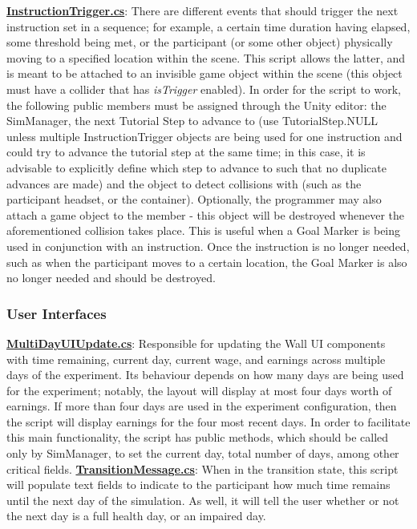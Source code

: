 \documentclass{article}
\begin{document}
\href{https://bit.ly/2uwAQ1u}{\textbf{InstructionTrigger.cs}}: There are different events that should trigger the next instruction set in a sequence; for example, a certain time duration having elapsed, some threshold being met, or the participant (or some other object) physically moving to a specified location within the scene. This script allows the latter, and is meant to be attached to an invisible game object within the scene (this object must have a collider that has \textit{isTrigger} enabled). In order for the script to work, the following public members must be assigned through the Unity editor: the SimManager, the next Tutorial Step to advance to (use TutorialStep.NULL unless multiple InstructionTrigger objects are being used for one instruction and could try to advance the tutorial step at the same time; in this case, it is advisable to explicitly define which step to advance to such that no duplicate advances are made) and the object to detect collisions with (such as the participant headset, or the container). Optionally, the programmer may also attach a game object to the  member - this object will be destroyed whenever the aforementioned collision takes place. This is useful when a Goal Marker is being used in conjunction with an instruction. Once the instruction is no longer needed, such as when the participant moves to a certain location, the Goal Marker is also no longer needed and should be destroyed. 


\subsubsection*{User Interfaces}
\href{https://bit.ly/2G9SRs1}{\textbf{MultiDayUIUpdate.cs}}: Responsible for updating the Wall UI components with time remaining, current day, current wage, and earnings across multiple days of the experiment. Its behaviour depends on how many days are being used for the experiment; notably, the layout will display at most four days worth of earnings. If more than four days are used in the experiment configuration, then the script will display earnings for the four most recent days. In order to facilitate this main functionality, the script has public methods, which should be called only by SimManager, to set the current day, total number of days, among other critical fields. \newline \newline
\href{https://bit.ly/2VHtW5B}{\textbf{TransitionMessage.cs}}: When in the transition state, this script will populate text fields to indicate to the participant how much time remains until the next day of the simulation. As well, it will tell the user whether or not the next day is a full health day, or an impaired day. \newline \newline
\end{document}
